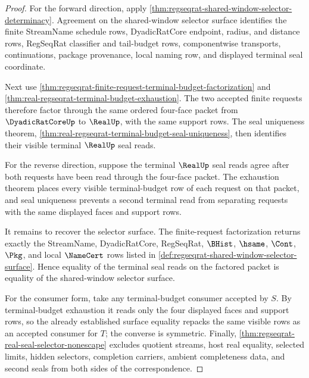 \begin{proof}
For the forward direction, apply \autoref{thm:regseqrat-shared-window-selector-determinacy}. Agreement on the shared-window selector surface identifies the finite StreamName schedule rows, DyadicRatCore endpoint, radius, and distance rows, RegSeqRat classifier and tail-budget rows, componentwise transports, continuations, package provenance, local naming row, and displayed terminal seal coordinate.

Next use \autoref{thm:regseqrat-finite-request-terminal-budget-factorization} and \autoref{thm:real-regseqrat-terminal-budget-exhaustion}. The two accepted finite requests therefore factor through the same ordered four-face packet from $\DyadicRatCoreUp$ to $\RealUp$, with the same support rows. The seal uniqueness theorem, \autoref{thm:real-regseqrat-terminal-budget-seal-uniqueness}, then identifies their visible terminal $\RealUp$ seal reads.

For the reverse direction, suppose the terminal $\RealUp$ seal reads agree after both requests have been read through the four-face packet. The exhaustion theorem places every visible terminal-budget row of each request on that packet, and seal uniqueness prevents a second terminal read from separating requests with the same displayed faces and support rows.

It remains to recover the selector surface. The finite-request factorization returns exactly the StreamName, DyadicRatCore, RegSeqRat, $\BHist$, $\hsame$, $\Cont$, $\Pkg$, and local $\NameCert$ rows listed in \autoref{def:regseqrat-shared-window-selector-surface}. Hence equality of the terminal seal reads on the factored packet is equality of the shared-window selector surface.

For the consumer form, take any terminal-budget consumer accepted by $S$. By terminal-budget exhaustion it reads only the four displayed faces and support rows, so the already established surface equality repacks the same visible rows as an accepted consumer for $T$; the converse is symmetric. Finally, \autoref{thm:regseqrat-real-seal-selector-nonescape} excludes quotient streams, host real equality, selected limits, hidden selectors, completion carriers, ambient completeness data, and second seals from both sides of the correspondence.
\end{proof}

